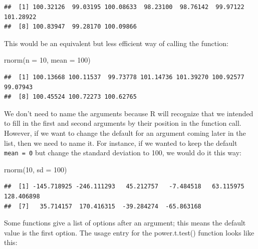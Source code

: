 \documentclass[
  oneside]{book}
\newenvironment{Shaded}{\begin{snugshade}}{\end{snugshade}}
\newcommand{\AttributeTok}[1]{\textcolor[rgb]{0.77,0.63,0.00}{#1}}
\newcommand{\DecValTok}[1]{\textcolor[rgb]{0.00,0.00,0.81}{#1}}
\newcommand{\FunctionTok}[1]{\textcolor[rgb]{0.00,0.00,0.00}{#1}}
\newcommand{\NormalTok}[1]{#1}
\begin{document}
\begin{verbatim}
##  [1] 100.32126  99.03195 100.08633  98.23100  98.76142  99.97122 101.28922
##  [8] 100.83947  99.28170 100.09866
\end{verbatim}

This would be an equivalent but less efficient way of calling the function:

\begin{Shaded}
\begin{Highlighting}[]
\FunctionTok{rnorm}\NormalTok{(}\AttributeTok{n =} \DecValTok{10}\NormalTok{, }\AttributeTok{mean =} \DecValTok{100}\NormalTok{)}
\end{Highlighting}
\end{Shaded}

\begin{verbatim}
##  [1] 100.13668 100.11537  99.73778 101.14736 101.39270 100.92577  99.07943
##  [8] 100.45524 100.72273 100.62765
\end{verbatim}

We don't need to name the arguments because R will recognize that we intended to fill in the first and second arguments by their position in the function call. However, if we want to change the default for an argument coming later in the list, then we need to name it. For instance, if we wanted to keep the default \texttt{mean\ =\ 0} but change the standard deviation to 100, we would do it this way:

\begin{Shaded}
\begin{Highlighting}[]
\FunctionTok{rnorm}\NormalTok{(}\DecValTok{10}\NormalTok{, }\AttributeTok{sd =} \DecValTok{100}\NormalTok{)}
\end{Highlighting}
\end{Shaded}

\begin{verbatim}
##  [1] -145.718925 -246.111293   45.212757   -7.484518   63.115975  128.406898
##  [7]   35.714157  170.416315  -39.284274  -65.863168
\end{verbatim}

Some functions give a list of options after an argument; this means the default value is the first option. The usage entry for the {power.t.test}{(}{)} function looks like this:
\end{document}
